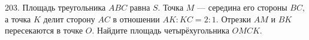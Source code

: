 203. Площадь треугольника $ABC$ равна $S.$ Точка $M$ --- середина его стороны $BC,$ а точка $K$ делит сторону $AC$ в отношении $AK:KC=2:1.$ Отрезки $AM$ и $BK$ пересекаются в точке $O.$ Найдите площадь четырёхугольника $OMCK.$\\
